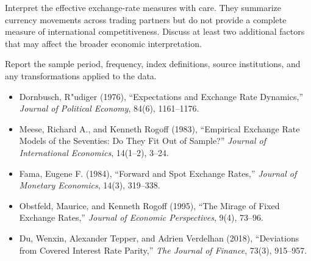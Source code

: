 Interpret the effective exchange-rate measures with care. They summarize currency movements across trading partners but do not provide a complete measure of international competitiveness. Discuss at least two additional factors that may affect the broader economic interpretation.

Report the sample period, frequency, index definitions, source institutions, and any transformations applied to the data.




\begin{itemize}

\item Dornbusch, R"udiger (1976),
``Expectations and Exchange Rate Dynamics,''
\emph{Journal of Political Economy}, 84(6), 1161--1176.

\item Meese, Richard A., and Kenneth Rogoff (1983),
``Empirical Exchange Rate Models of the Seventies: Do They Fit Out of Sample?''
\emph{Journal of International Economics}, 14(1--2), 3--24.

\item Fama, Eugene F. (1984),
``Forward and Spot Exchange Rates,''
\emph{Journal of Monetary Economics}, 14(3), 319--338.

\item Obstfeld, Maurice, and Kenneth Rogoff (1995),
``The Mirage of Fixed Exchange Rates,''
\emph{Journal of Economic Perspectives}, 9(4), 73--96.

\item Du, Wenxin, Alexander Tepper, and Adrien Verdelhan (2018),
``Deviations from Covered Interest Rate Parity,''
\emph{The Journal of Finance}, 73(3), 915--957.

\end{itemize}


